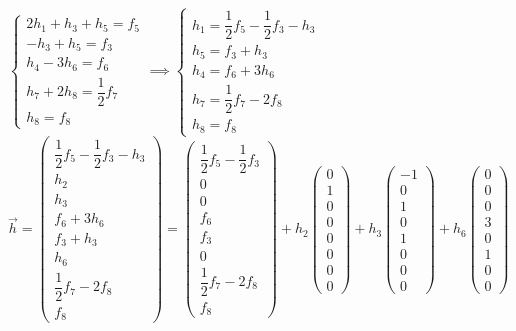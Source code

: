 \documentclass[a4paper, 10pt]{article}
\theoremstyle{theoremdd}
\theoremstyle{theoremdd}
\theoremstyle{theoremdd}
\theoremstyle{theoremdd}
\theoremstyle{theoremdd}
\theoremstyle{theoremdd}
\theoremstyle{theoremdd}
\theoremstyle{theoremdd}
\begin{document}
$\begin{cases}
2h_1 + h_3 + h_5 = f_5 \\
-h_3 + h_5 = f_3 \\
h_4 - 3h_6 = f_6 \\
h_7 + 2h_8 = \dfrac{1}{2}f_7 \\
h_8 = f_8
\end{cases} \implies \begin{cases}
h_1 = \dfrac{1}{2}f_5 - \dfrac{1}{2}f_3 - h_3 \\
h_5 = f_3 + h_3 \\
h_4 = f_6 + 3h_6 \\
h_7 = \dfrac{1}{2}f_7 - 2f_8 \\
h_8 = f_8
\end{cases}$\\
$\vec{h} = \begin{pmatrix}
\dfrac{1}{2}f_5 - \dfrac{1}{2}f_3 - h_3 \\
h_2 \\
h_3 \\
f_6 + 3h_6 \\
f_3 + h_3 \\
h_6 \\
\dfrac{1}{2}f_7 - 2f_8 \\
f_8
\end{pmatrix} = \begin{pmatrix}
\dfrac{1}{2}f_5 - \dfrac{1}{2}f_3 \\
0 \\
0 \\
f_6 \\
f_3 \\
0 \\
\dfrac{1}{2}f_7 - 2f_8 \\
f_8
\end{pmatrix} + h_2 \begin{pmatrix}
0 \\ 1 \\ 0 \\ 0 \\ 0 \\ 0 \\ 0 \\ 0
\end{pmatrix} + h_3 \begin{pmatrix}
-1 \\ 0 \\ 1 \\ 0 \\ 1 \\ 0 \\ 0 \\ 0
\end{pmatrix} + h_6 \begin{pmatrix}
0 \\ 0 \\ 0 \\ 3 \\ 0 \\ 1 \\ 0 \\ 0
\end{pmatrix}$\\
\end{document}
